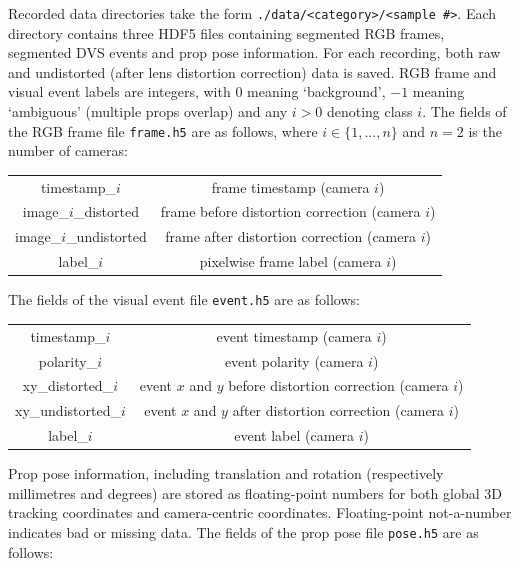 \documentclass{article}
\begin{document}
Recorded data directories take the form \lstinline|./data/<category>/<sample #>|. Each directory contains three HDF5 files containing segmented RGB frames, segmented DVS events and prop pose information. For each recording, both raw and undistorted (after lens distortion correction) data is saved. RGB frame and visual event labels are integers, with $0$ meaning `background', $-1$ meaning `ambiguous' (multiple props overlap) and any $i > 0$ denoting class $i$. The fields of the RGB frame file \lstinline|frame.h5| are as follows, where $i \in \{1,...,n\}$ and $n = 2$ is the number of cameras:
\begin{center}
	\begin{tabular}{|c|c|}
		timestamp\_$i$           & frame timestamp (camera $i$) \\
		image\_$i$\_distorted    & frame before distortion correction (camera $i$) \\
		image\_$i$\_undistorted  & frame after distortion correction (camera $i$) \\
		label\_$i$               & pixelwise frame label (camera $i$) \\
	\end{tabular}
\end{center}
The fields of the visual event file \lstinline|event.h5| are as follows:
\begin{center}
	\begin{tabular}{|c|c|}
		timestamp\_$i$        & event timestamp (camera $i$) \\
		polarity\_$i$         & event polarity (camera $i$) \\
		xy\_distorted\_$i$    & event $x$ and $y$ before distortion correction (camera $i$) \\
		xy\_undistorted\_$i$  & event $x$ and $y$ after distortion correction (camera $i$) \\
		label\_$i$            & event label (camera $i$) \\
	\end{tabular}
\end{center}
Prop pose information, including translation and rotation (respectively millimetres and degrees) are stored as floating-point numbers for both global 3D tracking coordinates and camera-centric coordinates. Floating-point not-a-number indicates bad or missing data. The fields of the prop pose file \lstinline|pose.h5| are as follows:
\end{document}
